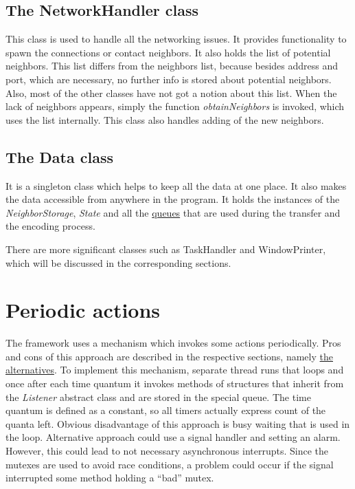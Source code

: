\subsection{The NetworkHandler class}\label{the-networkhandler-class}

This class is used to handle all the networking issues. It provides
functionality to spawn the connections or contact neighbors. It also
holds the list of potential neighbors. This list differs from the
neighbors list, because besides address and port, which are necessary,
no further info is stored about potential neighbors. Also, most of the
other classes have not got a notion about this list. When the lack of
neighbors appears, simply the function \textit{obtainNeighbors} is
invoked, which uses the list internally. This class also handles adding
of the new neighbors.

\subsection{The Data class}\label{the-data-class}

It is a singleton class which helps to keep all the data at one place.
It also makes the data accessible from anywhere in the program. It holds
the instances of the \textit{NeighborStorage}, \textit{State} and all
the \hyperref[queues]{queues} that are used during the transfer and the
encoding process.

There are more significant classes such as TaskHandler and
WindowPrinter, which will be discussed in the corresponding sections.

\section{Periodic actions}\label{periodic-actions}

The framework uses a mechanism which invokes some actions periodically.
Pros and cons of this approach are described in the respective sections,
namely
\hyperref[problems-alternatives-and-possible-improvements]{the alternatives}.
To implement this mechanism, separate thread runs that loops and once
after each time quantum it invokes methods of structures that inherit
from the \textit{Listener} abstract class and are stored in the special
queue. The time quantum is defined as a constant, so all timers actually
express count of the quanta left. Obvious disadvantage of this approach
is busy waiting that is used in the loop. Alternative approach could use
a signal handler and setting an alarm. However, this could lead to not
necessary asynchronous interrupts. Since the mutexes are used to avoid
race conditions, a problem could occur if the signal interrupted some
method holding a ``bad'' mutex.

